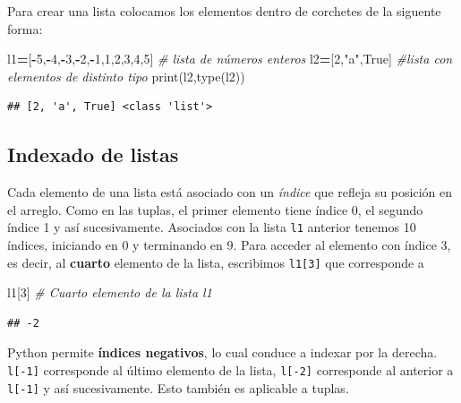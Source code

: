 \documentclass[
]{book}
\newenvironment{Shaded}{\begin{snugshade}}{\end{snugshade}}
\newcommand{\BuiltInTok}[1]{#1}
\newcommand{\CommentTok}[1]{\textcolor[rgb]{0.56,0.35,0.01}{\textit{#1}}}
\newcommand{\DecValTok}[1]{\textcolor[rgb]{0.00,0.00,0.81}{#1}}
\newcommand{\NormalTok}[1]{#1}
\newcommand{\OperatorTok}[1]{\textcolor[rgb]{0.81,0.36,0.00}{\textbf{#1}}}
\newcommand{\StringTok}[1]{\textcolor[rgb]{0.31,0.60,0.02}{#1}}
\newcommand{\VariableTok}[1]{\textcolor[rgb]{0.00,0.00,0.00}{#1}}
\theoremstyle{definition}
\theoremstyle{definition}
\theoremstyle{definition}
\theoremstyle{definition}
\theoremstyle{remark}
\begin{document}
Para crear una lista colocamos los elementos dentro de corchetes de la siguente forma:

\begin{Shaded}
\begin{Highlighting}[]
\NormalTok{l1}\OperatorTok{=}\NormalTok{[}\OperatorTok{{-}}\DecValTok{5}\NormalTok{,}\OperatorTok{{-}}\DecValTok{4}\NormalTok{,}\OperatorTok{{-}}\DecValTok{3}\NormalTok{,}\OperatorTok{{-}}\DecValTok{2}\NormalTok{,}\OperatorTok{{-}}\DecValTok{1}\NormalTok{,}\DecValTok{1}\NormalTok{,}\DecValTok{2}\NormalTok{,}\DecValTok{3}\NormalTok{,}\DecValTok{4}\NormalTok{,}\DecValTok{5}\NormalTok{] }\CommentTok{\# lista de números enteros}
\NormalTok{l2}\OperatorTok{=}\NormalTok{[}\DecValTok{2}\NormalTok{,}\StringTok{"a"}\NormalTok{,}\VariableTok{True}\NormalTok{]    }\CommentTok{\#lista con elementos de distinto tipo}
\BuiltInTok{print}\NormalTok{(l2,}\BuiltInTok{type}\NormalTok{(l2))}
\end{Highlighting}
\end{Shaded}

\begin{verbatim}
## [2, 'a', True] <class 'list'>
\end{verbatim}

\hypertarget{IndexadoDeListas}{%
\subsection{Indexado de listas}\label{IndexadoDeListas}}

Cada elemento de una lista está asociado con un \emph{índice} que refleja su posición en el arreglo. Como en las tuplas, el primer elemento tiene índice 0, el segundo índice 1 y así sucesivamente. Asociados con la lista \texttt{l1} anterior tenemos 10 índices, iniciando en 0 y terminando en 9. Para acceder al elemento con índice 3, es decir, al \textbf{cuarto} elemento de la lista, escribimos \texttt{l1{[}3{]}} que corresponde a

\begin{Shaded}
\begin{Highlighting}[]
\NormalTok{l1[}\DecValTok{3}\NormalTok{] }\CommentTok{\# Cuarto elemento de la lista l1}
\end{Highlighting}
\end{Shaded}

\begin{verbatim}
## -2
\end{verbatim}

Python permite \textbf{índices negativos}, lo cual conduce a indexar por la derecha. \texttt{l{[}-1{]}} corresponde al último elemento de la lista, \texttt{l{[}-2{]}} corresponde al anterior a \texttt{l{[}-1{]}} y así sucesivamente. Esto también es aplicable a tuplas.
\end{document}
